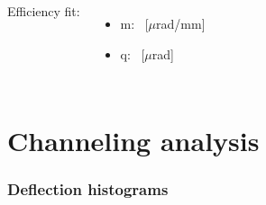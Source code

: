 \documentclass[10pt]{beamer}
\begin{document}
\begin{frame}
\begin{columns}[t]
Efficiency fit:
\begin{itemize}[leftmargin=*]
 \item m: \torsionm\ [$\mu$rad/mm]
 \item q: \torsionq\ [$\mu$rad]
\end{itemize}


\end{columns}
\end{frame}


\section{Channeling analysis}

\begin{frame}
\frametitle{Deflection histograms}

\begin{columns}[c] %


\end{columns}
\end{frame}
\end{document}

